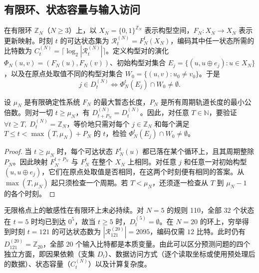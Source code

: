 \subsection{有限环、状态容量与输入访问}

在有限环 $\mathbb{Z}_N$（$N \ge 3$）上，以 $X_N = \{0, 1\}^{\mathbb{Z}_N}$ 表示构型空间，$F_N : X_N \to X_N$ 表示更新映射。时刻 $t$ 的可达状态集为 $\mathcal{R}_t^{(N)} = F_N^t(X_N)$，编码其中任一状态所需的比特数为 $C_t^{(N)} = \lceil \log_2 |\mathcal{R}_t^{(N)}| \rceil$。定义构型对的演化 $\Phi_N(u, v) = (F_N(u), F_N(v))$、初始构型对集合 $E_j = \{ (u, u \oplus e_j) : u \in X_N \}$，以及在原点处取值不同的构型对集合 $W_0 = \{ (u,v) : u_0 \ne v_0 \}$。于是
\begin{equation}
j \in D_t^{(N)} \iff \Phi_N^t(E_j) \cap W_0 \ne \emptyset.
\end{equation}

\begin{proposition}[本质性持续成立的有限证书]\label{prop:ring_cert}
设 $\mu_N$ 是有限确定性系统 $F_N$ 的最大暂态长度，$P_N$ 是所有周期轨道长度的最小公倍数。则对一切 $t \ge \mu_N$，有 $D_{t+P_N}^{(N)} = D_t^{(N)}$。因此，对任意 $T \in \mathbb{N}$，要验证 $\forall t \ge T,\; D_t^{(N)} = \mathbb{Z}_N$，等价地只需对每个 $j \in \mathbb{Z}_N$ 和每个满足 $T \le t < \max(T, \mu_N) + P_N$ 的 $t$，检验 $\Phi_N^t(E_j) \cap W_0 \ne \emptyset$。
\end{proposition}

\begin{proof}
当 $t\ge\mu_N$ 时，每个可达状态 $F_N^t(u)$ 都已落在某个循环上，且其周期整除 $P_N$。因此映射 $F_N^{t+P_N}$ 与 $F_N^t$ 在整个 $X_N$ 上相同。对任意 $j$ 和任意一对初始构型 $(u,u\oplus e_j)$，它们在原点处取值是否相同，在这两个时刻便有相同的答案。从 $\max(T,\mu_N)$ 起只须检查一个周期。若 $T<\mu_N$，还须逐一检查从 $T$ 到 $\mu_N-1$ 的各个时刻。
\end{proof}

\begin{remark}[状态压缩与输入敏感性]\label{rem:ring5}
无限格点上的敏感性在有限环上未必持续。对 $N = 5$ 的规则 110，全部 $32$ 个状态在 $t = 5$ 时均已到达 $0^5$，故当 $t \ge 5$ 时，$D_t^{(5)} = \emptyset$。在 $N = 20$ 的环上，穷举得到时刻 $t = 121$ 的可达状态数为 $|\mathcal{R}_{121}^{(20)}| = 2095$，编码仅需 $12$ 比特。此时仍有 $D_{121}^{(20)} = \mathbb{Z}_{20}$，全部 $20$ 个输入比特都是本质变量。由此可以区分预测问题的四个独立方面，即因果依赖（支集 $D_t$）、数据访问方式（逐个读取坐标或使用预处理后的数据）、状态容量（$C_t^{(N)}$）以及计算复杂度。
\end{remark}

